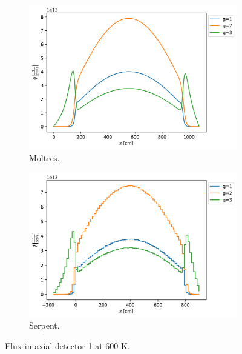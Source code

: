 \documentclass[11pt,letterpaper]{article}
\begin{document}
\begin{figure}[htbp!]
	\centering
	\begin{subfigure}[t]{0.4\textwidth}
		\centering
		\includegraphics[width=\linewidth]{figures-fullcore/3D-fullcore-600-15Gd-axial1}
		\caption{Moltres.}
	\end{subfigure}
	\begin{subfigure}[t]{0.4\textwidth}
		\centering
		\includegraphics[width=\linewidth]{figures-fullcore/serpent26G-600-collapse-Axial1}
		\caption{Serpent.}
	\end{subfigure}
	\hfill
	\caption{Flux in axial detector 1 at 600 K.}
	\label{fig:fullcore-600-axial1}
\end{figure}
\end{document}
